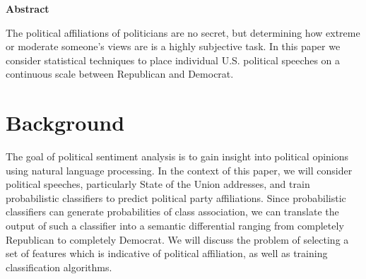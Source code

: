 \documentclass{amsart}
\newtheorem{thm}{Theorem}[section]
\theoremstyle{definition}
\theoremstyle{remark}
\numberwithin{equation}{section}
\begin{document}






\begin{center}\textbf{Abstract}\end{center}
The political affiliations of politicians are no secret, but determining how extreme or moderate someone's views are is a highly subjective task. In this paper we consider statistical techniques to place individual U.S. political speeches on a continuous scale between Republican and Democrat.\\


\newpage

\tableofcontents

\newpage

\section{Background}
The goal of political sentiment analysis is to gain insight into political opinions using natural language processing. In the context of this paper, we will consider political speeches, particularly State of the Union addresses, and train probabilistic classifiers to predict political party affiliations. Since probabilistic classifiers can generate probabilities of class association, we can translate the output of such a classifier into a semantic differential ranging from completely Republican to completely Democrat. We will discuss the problem of selecting a set of features which is indicative of political affiliation, as well as training classification algorithms.\\
\end{document}
